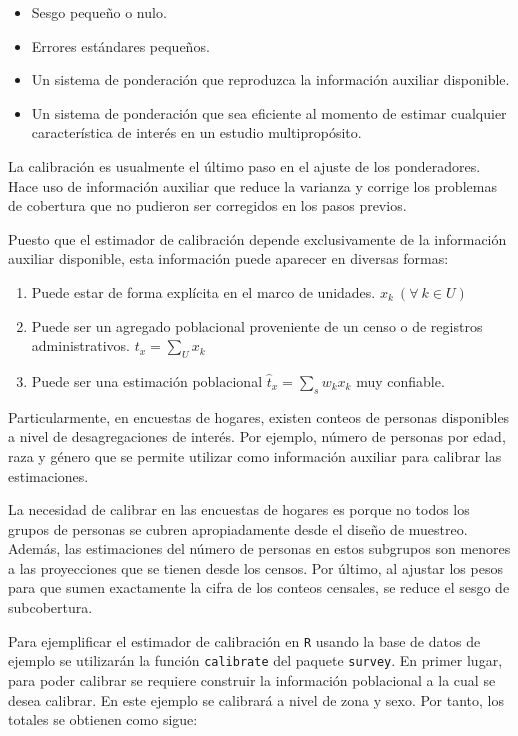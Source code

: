 \documentclass[
  12pt,
]{book}
\providecommand{\tightlist}{%
  \setlength{\itemsep}{0pt}\setlength{\parskip}{0pt}}
\begin{document}
\begin{itemize}
\tightlist
\item
  Sesgo pequeño o nulo.
\item
  Errores estándares pequeños.
\item
  Un sistema de ponderación que reproduzca la información auxiliar disponible.
\item
  Un sistema de ponderación que sea eficiente al momento de estimar cualquier característica de interés en un estudio multipropósito.
\end{itemize}

La calibración es usualmente el último paso en el ajuste de los ponderadores. Hace uso de información auxiliar que reduce la varianza y corrige los problemas de cobertura que no pudieron ser corregidos en los pasos previos.

Puesto que el estimador de calibración depende exclusivamente de la información auxiliar disponible, esta información puede aparecer en diversas formas:

\begin{enumerate}
\def\labelenumi{\arabic{enumi}.}
\item
  Puede estar de forma explícita en el marco de unidades. \(x_k \ (\forall \ k \in U)\)
\item
  Puede ser un agregado poblacional proveniente de un censo o de registros administrativos. \(t_x = \sum_U x_k\)
\item
  Puede ser una estimación poblacional \(\hat{t}_x = \sum_s w_kx_k\) muy confiable.
\end{enumerate}

Particularmente, en encuestas de hogares, existen conteos de personas disponibles a nivel de desagregaciones de interés. Por ejemplo, número de personas por edad, raza y género que se permite utilizar como información auxiliar para calibrar las estimaciones.

La necesidad de calibrar en las encuestas de hogares es porque no todos los grupos de personas se cubren apropiadamente desde el diseño de muestreo. Además, las estimaciones del número de personas en estos subgrupos son menores a las proyecciones que se tienen desde los censos. Por último, al ajustar los pesos para que sumen exactamente la cifra de los conteos censales, se reduce el sesgo de subcobertura.

Para ejemplificar el estimador de calibración en \texttt{R} usando la base de datos de ejemplo se utilizarán la función \texttt{calibrate} del paquete \texttt{survey}. En primer lugar, para poder calibrar se requiere construir la información poblacional a la cual se desea calibrar. En este ejemplo se calibrará a nivel de zona y sexo. Por tanto, los totales se obtienen como sigue:
\end{document}

